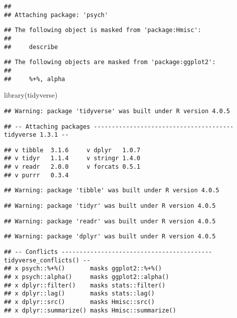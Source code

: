 \documentclass[
]{article}
\newenvironment{Shaded}{\begin{snugshade}}{\end{snugshade}}
\newcommand{\FunctionTok}[1]{\textcolor[rgb]{0.00,0.00,0.00}{#1}}
\newcommand{\NormalTok}[1]{#1}
\begin{document}
\begin{verbatim}
## 
## Attaching package: 'psych'
\end{verbatim}

\begin{verbatim}
## The following object is masked from 'package:Hmisc':
## 
##     describe
\end{verbatim}

\begin{verbatim}
## The following objects are masked from 'package:ggplot2':
## 
##     %+%, alpha
\end{verbatim}

\begin{Shaded}
\begin{Highlighting}[]
\FunctionTok{library}\NormalTok{(tidyverse)}
\end{Highlighting}
\end{Shaded}

\begin{verbatim}
## Warning: package 'tidyverse' was built under R version 4.0.5
\end{verbatim}

\begin{verbatim}
## -- Attaching packages --------------------------------------- tidyverse 1.3.1 --
\end{verbatim}

\begin{verbatim}
## v tibble  3.1.6     v dplyr   1.0.7
## v tidyr   1.1.4     v stringr 1.4.0
## v readr   2.0.0     v forcats 0.5.1
## v purrr   0.3.4
\end{verbatim}

\begin{verbatim}
## Warning: package 'tibble' was built under R version 4.0.5
\end{verbatim}

\begin{verbatim}
## Warning: package 'tidyr' was built under R version 4.0.5
\end{verbatim}

\begin{verbatim}
## Warning: package 'readr' was built under R version 4.0.5
\end{verbatim}

\begin{verbatim}
## Warning: package 'dplyr' was built under R version 4.0.5
\end{verbatim}

\begin{verbatim}
## -- Conflicts ------------------------------------------ tidyverse_conflicts() --
## x psych::%+%()       masks ggplot2::%+%()
## x psych::alpha()     masks ggplot2::alpha()
## x dplyr::filter()    masks stats::filter()
## x dplyr::lag()       masks stats::lag()
## x dplyr::src()       masks Hmisc::src()
## x dplyr::summarize() masks Hmisc::summarize()
\end{verbatim}
\end{document}
